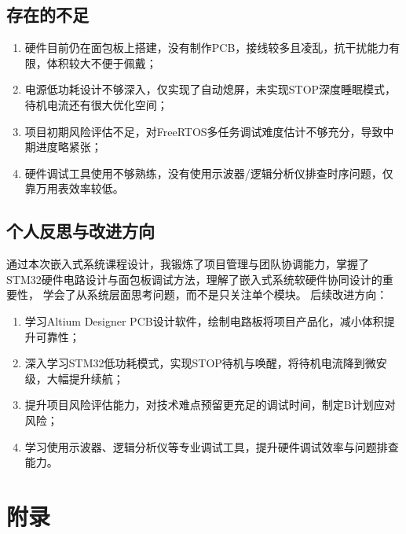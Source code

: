 \documentclass[12pt, a4paper]{ctexart}
\begin{document}
\subsection{存在的不足}
\begin{enumerate}
    \item 硬件目前仍在面包板上搭建，没有制作PCB，接线较多且凌乱，抗干扰能力有限，体积较大不便于佩戴；
    \item 电源低功耗设计不够深入，仅实现了自动熄屏，未实现STOP深度睡眠模式，待机电流还有很大优化空间；
    \item 项目初期风险评估不足，对FreeRTOS多任务调试难度估计不够充分，导致中期进度略紧张；
    \item 硬件调试工具使用不够熟练，没有使用示波器/逻辑分析仪排查时序问题，仅靠万用表效率较低。
\end{enumerate}

\subsection{个人反思与改进方向}
通过本次嵌入式系统课程设计，我锻炼了项目管理与团队协调能力，掌握了STM32硬件电路设计与面包板调试方法，理解了嵌入式系统软硬件协同设计的重要性，
学会了从系统层面思考问题，而不是只关注单个模块。
后续改进方向：
\begin{enumerate}
    \item 学习Altium Designer PCB设计软件，绘制电路板将项目产品化，减小体积提升可靠性；
    \item 深入学习STM32低功耗模式，实现STOP待机与唤醒，将待机电流降到微安级，大幅提升续航；
    \item 提升项目风险评估能力，对技术难点预留更充足的调试时间，制定B计划应对风险；
    \item 学习使用示波器、逻辑分析仪等专业调试工具，提升硬件调试效率与问题排查能力。
\end{enumerate}

\section{附录}
\end{document}
